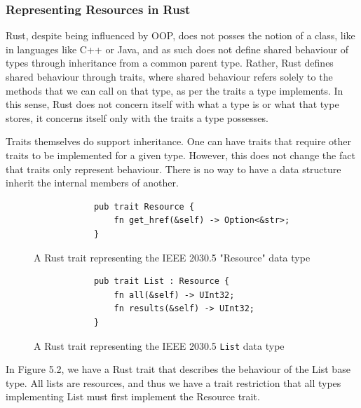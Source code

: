 \subsubsection{Representing Resources in Rust}
Rust, despite being influenced by OOP, does not posses the notion of a class, like in languages like C++ or Java, and as such does not define shared behaviour of types through inheritance from a common parent type. 
Rather, Rust defines shared behaviour through traits, where shared behaviour refers solely to the methods that we can call on that type, as per the traits a type implements.
In this sense, Rust does not concern itself with what a type is or what that type stores, it concerns itself only with the traits a type possesses.

Traits themselves do support inheritance. One can have traits that require other traits to be implemented for a given type. However, this does not change the fact that traits only represent behaviour. 
There is no way to have a data structure inherit the internal members of another.

\begin{figure}[H]
    \begin{center}
        \begin{lstlisting}
            pub trait Resource {
                fn get_href(&self) -> Option<&str>;
            }
        \end{lstlisting}
        \caption{A Rust trait representing the IEEE 2030.5 "Resource" data type}
    \end{center}
\end{figure}



\begin{figure}[H]
    \begin{center}
        \begin{lstlisting}
            pub trait List : Resource {
                fn all(&self) -> UInt32;
                fn results(&self) -> UInt32;
            }
        \end{lstlisting}
        \caption{A Rust trait representing the IEEE 2030.5 \texttt{List} data type}
    \end{center}
\end{figure}

In Figure 5.2, we have a Rust trait that describes the behaviour of the List base type. All lists are resources, and thus we have a trait restriction that all types implementing List must first implement the Resource trait.

